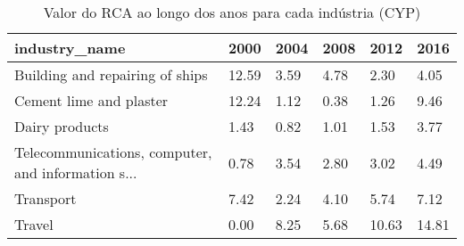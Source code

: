 \begin{table}
\centering
\caption{Valor do RCA ao longo dos anos para cada indústria (CYP)}
\begin{tabular}{p{6cm}p{1.5cm}p{1.5cm}p{1.5cm}p{1.5cm}p{1.5cm}}
\toprule
                                     industry\_name &  2000 & 2004 & 2008 &  2012 &  2016 \\
\midrule
                   Building and repairing of ships & 12.59 & 3.59 & 4.78 &  2.30 &  4.05 \\
                           Cement lime and plaster & 12.24 & 1.12 & 0.38 &  1.26 &  9.46 \\
                                    Dairy products &  1.43 & 0.82 & 1.01 &  1.53 &  3.77 \\
Telecommunications, computer, and information s... &  0.78 & 3.54 & 2.80 &  3.02 &  4.49 \\
                                         Transport &  7.42 & 2.24 & 4.10 &  5.74 &  7.12 \\
                                            Travel &  0.00 & 8.25 & 5.68 & 10.63 & 14.81 \\
\bottomrule
\end{tabular}
\end{table}
